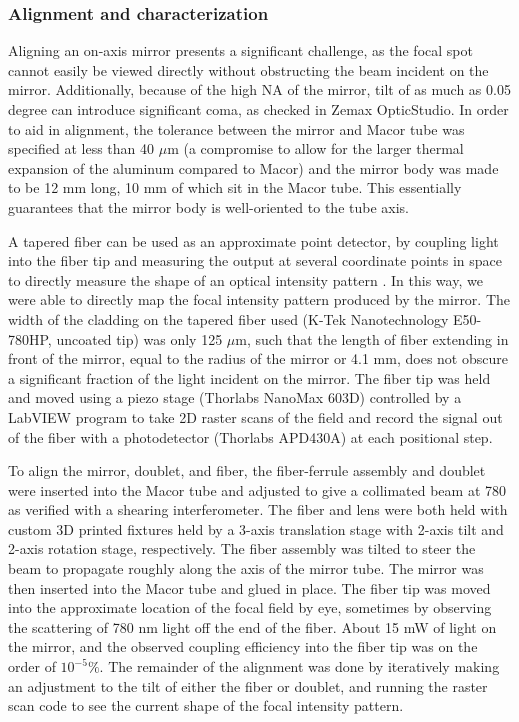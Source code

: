 \subsubsection{Alignment and characterization}

Aligning an on-axis mirror presents a significant challenge, as the focal spot cannot easily be viewed directly without obstructing the beam incident on the mirror. Additionally, because of the high NA of the mirror, tilt of as much as 0.05 degree can introduce significant coma, as checked in Zemax OpticStudio. In order to aid in alignment, the tolerance between the mirror and Macor tube was specified at less than 40 $\mu \mathrm{m}$ (a compromise to allow for the larger thermal expansion of the aluminum compared to Macor) and the mirror body was made to be 12 mm long, 10 mm of which sit in the Macor tube. This essentially guarantees that the mirror body is well-oriented to the tube axis. 

A tapered fiber can be used as an approximate point detector, by coupling light into the fiber tip and measuring the output at several coordinate points in space to directly measure the shape of an optical intensity pattern \cite{TOLEDOCROW1995,RHODES1998}. In this way, we were able to directly map the focal intensity pattern produced by the mirror. The width of the cladding on the tapered fiber used (K-Tek Nanotechnology E50-780HP, uncoated tip) was only 125 $\mu \mathrm{m}$, such that the length of fiber extending in front of the mirror, equal to the radius of the mirror or 4.1 mm, does not obscure a significant fraction of the light incident on the mirror. The fiber tip was held and moved using a piezo stage (Thorlabs NanoMax 603D) controlled by a LabVIEW program to take 2D raster scans of the field and record the signal out of the fiber with a photodetector (Thorlabs APD430A) at each positional step. 

To align the mirror, doublet, and fiber, the fiber-ferrule assembly and doublet were inserted into the Macor tube and adjusted to give a collimated beam at 780 as verified with a shearing interferometer. The fiber and lens were both held with custom 3D printed fixtures held by a 3-axis translation stage with 2-axis tilt and 2-axis rotation stage, respectively. The fiber assembly was tilted to steer the beam to propagate roughly along the axis of the mirror tube. The mirror was then inserted into the Macor tube and glued in place. The fiber tip was moved into the approximate location of the focal field by eye, sometimes by observing the scattering of 780 nm light off the end of the fiber. About 15 mW of light on the mirror, and the observed coupling efficiency into the fiber tip was on the order of $10^{-5}\%$. The remainder of the alignment was done by iteratively making an adjustment to the tilt of either the fiber or doublet, and running the raster scan code to see the current shape of the focal intensity pattern.

